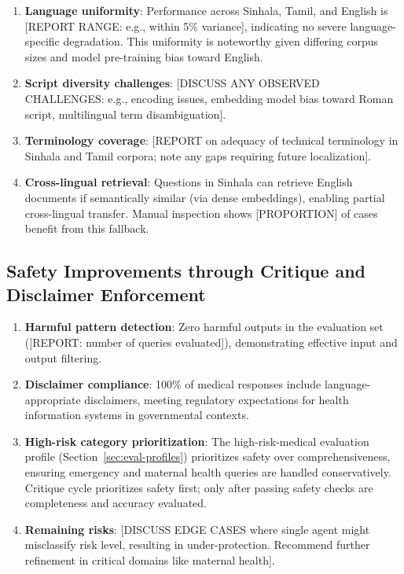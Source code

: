 \documentclass[11pt,a4paper]{article}
\begin{document}
\begin{enumerate}
    \item \textbf{Language uniformity}: Performance across Sinhala, Tamil, and English is [REPORT RANGE: e.g., within 5\% variance], indicating no severe language-specific degradation. This uniformity is noteworthy given differing corpus sizes and model pre-training bias toward English.
    
    \item \textbf{Script diversity challenges}: [DISCUSS ANY OBSERVED CHALLENGES: e.g., encoding issues, embedding model bias toward Roman script, multilingual term disambiguation].
    
    \item \textbf{Terminology coverage}: [REPORT on adequacy of technical terminology in Sinhala and Tamil corpora; note any gaps requiring future localization].
    
    \item \textbf{Cross-lingual retrieval}: Questions in Sinhala can retrieve English documents if semantically similar (via dense embeddings), enabling partial cross-lingual transfer. Manual inspection shows [PROPORTION] of cases benefit from this fallback.
\end{enumerate}

\subsection{Safety Improvements through Critique and Disclaimer Enforcement}
\label{sec:discussion-safety}

\begin{enumerate}
    \item \textbf{Harmful pattern detection}: Zero harmful outputs in the evaluation set ([REPORT: number of queries evaluated]), demonstrating effective input and output filtering.
    
    \item \textbf{Disclaimer compliance}: 100\% of medical responses include language-appropriate disclaimers, meeting regulatory expectations for health information systems in governmental contexts.
    
    \item \textbf{High-risk category prioritization}: The high-risk-medical evaluation profile (Section~\ref{sec:eval-profiles}) prioritizes safety over comprehensiveness, ensuring emergency and maternal health queries are handled conservatively. Critique cycle prioritizes safety first; only after passing safety checks are completeness and accuracy evaluated.
    
    \item \textbf{Remaining risks}: [DISCUSS EDGE CASES where single agent might misclassify risk level, resulting in under-protection. Recommend further refinement in critical domains like maternal health].
\end{enumerate}
\end{document}

